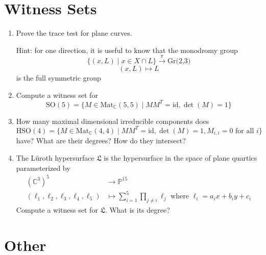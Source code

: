\documentclass[11pt,reqno]{amsart}
\theoremstyle{definition}
\theoremstyle{remark}
\numberwithin{equation}{section}
\begin{document}
\section{Witness Sets}
\begin{enumerate}
\item Prove the trace test for plane curves. 

Hint: for one direction, it is useful to know that the monodromy group $$\{(x,L) \mid x \in X \cap L\} \xrightarrow{\pi} \textrm{Gr(2,3)}$$ $$(x,L) \mapsto L$$ is the full symmetric group

\item Compute a witness set for $$\text{SO}(5) = \{M \in \text{Mat}_{\mathbb{C}}(5,5) \mid M M^T = \textrm{id}, \det(M) = 1\}$$

\item How many maximal dimensional irreducible components does
$$\text{HSO}(4) = \{M \in \text{Mat}_{\mathbb{C}}(4,4) \mid MM^T= \textrm{id}, \det(M) = 1, M_{i,i}=0 \text{ for all }i\}$$
have? What are their degrees? How do they intersect?

\item The L\"uroth hypersurface $\mathfrak{L}$ is the hypersurface in the space of plane quartics parameterized by 
\begin{align*}
(\mathbb{C}^3)^5 &\to \mathbb{P}^{15}\\
(\ell_1,\ell_2,\ell_3,\ell_4,\ell_5) &\mapsto \sum_{i=1}^5 \prod_{j \neq i} \ell_j \text{ where } \ell_i = a_ix+b_iy+c_i
\end{align*}
Compute a witness set for $\mathfrak{L}$. What is its degree?


\end{enumerate}

\section{Other}
\end{document}
